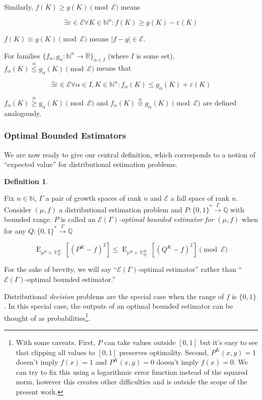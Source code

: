 \documentclass{article}
\numberwithin{equation}{section}
\theoremstyle{definition}
\newtheorem{definition}{Definition}[section]
\theoremstyle{plain}
\newcommand{\Bool}{\{0,1\}}
\newcommand{\Words}{{\Bool^*}}
\DeclareMathOperator{\E}{E}
\DeclareMathOperator{\Un}{U}
\newcommand{\Nats}{\mathbb{N}}
\newcommand{\Rats}{\mathbb{Q}}
\newcommand{\Reals}{\mathbb{R}}
\newcommand{\NatFun}{\Nats^n \rightarrow}
\newcommand{\Abs}[1]{\lvert #1 \rvert}
\newcommand{\Fall}{\mathcal{E}}
\newcommand{\EG}{\Fall(\Gamma)}
\newcommand{\Scheme}{\xrightarrow{\Gamma}}
\begin{document}
Similarly, $f(K) \geq g(K) \pmod \Fall$ means 

\[\exists \varepsilon \in \Fall \forall K \in \Nats^n: f(K) \geq g(K) - \varepsilon(K)\]

$f(K) \equiv g(K) \pmod \Fall$ means $\Abs{f-g} \in \Fall$.

For families ${\{f_\alpha,g_\alpha: \NatFun \Reals\}_{\alpha \in I}}$ (where ${I}$ is some set), ${f_\alpha(K) \overset{\alpha}{\leq} g_\alpha(K) \pmod \Fall}$ means that 

\[\exists \varepsilon \in \Fall \forall \alpha \in I, K \in \Nats^n: f_\alpha(K) \leq g_\alpha(K) + \varepsilon(K)\]

${f_\alpha(K) \overset{\alpha}{\geq} g_\alpha(K) \pmod \Fall}$ and ${f_\alpha(K) \overset{\alpha}{\equiv} g_\alpha(K) \pmod \Fall}$ are defined analogously.

\subsubsection{Optimal Bounded Estimators}

We are now ready to give our central definition, which corresponds to a notion of \enquote{expected value} for distributional estimation problems.

\begin{definition}
\label{def:op}

Fix $n \in \Nats$, $\Gamma$ a pair of growth spaces of rank $n$ and $\Fall$ a fall space of rank $n$. Consider $(\mu,f)$ a distributional estimation problem and $P: \Words \Scheme \Rats$ with bounded range. $P$ is called an \emph{$\EG$-optimal bounded estimator for $(\mu,f)$} when for any $Q: \Words \Scheme \Rats$

\begin{equation}
\label{eqn:op}
\E_{\mu^{K} \times \Un_P^K}[(P^K - f)^2] \leq \E_{\mu^{K} \times \Un_Q^K}[(Q^K - f)^2] \pmod \Fall
\end{equation}

For the sake of brevity, we will say \enquote{${\EG}$-optimal estimator} rather than \enquote{${\EG}$-optimal bounded estimator.}

\end{definition}

Distributional \emph{decision} problems are the special case when the range of $f$ is $\Bool$. In this special case, the outputs of an optimal bounded estimator can be thought of as probabilities\footnote{With some caveats. First, $P$ can take values outside $[0,1]$ but it's easy to see that clipping all values to $[0,1]$ preserves optimality. Second, $P^{K}(x,y)=1$ doesn't imply $f(x) = 1$ and $P^{K}(x,y)=0$ doesn't imply $f(x)=0$. We can try to fix this using a logarithmic error function instead of the squared norm, however this creates other difficulties and is outside the scope of the present work.}.
\end{document}
